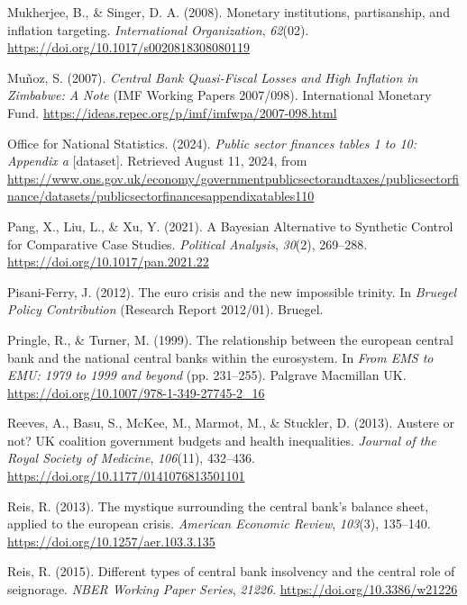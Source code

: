 \documentclass[
  a4paper,
  abstract=true]{scrartcl}
\newlength{\cslhangindent}
\newenvironment{CSLReferences}[2] %
 {\begin{list}{}{%
  \setlength{\itemindent}{0pt}
  \setlength{\leftmargin}{0pt}
  \setlength{\parsep}{0pt}
  \ifodd #1
   \setlength{\leftmargin}{\cslhangindent}
   \setlength{\itemindent}{-1\cslhangindent}
  \fi
  \setlength{\itemsep}{#2\baselineskip}}}
 {\end{list}}
\theoremstyle{definition}
\begin{document}
\begin{CSLReferences}{1}{0}
Mukherjee, B., \& Singer, D. A. (2008). Monetary institutions,
partisanship, and inflation targeting. \emph{International
Organization}, \emph{62}(02).
\url{https://doi.org/10.1017/s0020818308080119}

Muñoz, S. (2007). \emph{{Central Bank Quasi-Fiscal Losses and High
Inflation in Zimbabwe: A Note}} (IMF Working Papers 2007/098).
International Monetary Fund.
\url{https://ideas.repec.org/p/imf/imfwpa/2007-098.html}

Office for National Statistics. (2024). \emph{Public sector finances
tables 1 to 10: Appendix a} {[}dataset{]}. Retrieved August 11, 2024,
from
\url{https://www.ons.gov.uk/economy/governmentpublicsectorandtaxes/publicsectorfinance/datasets/publicsectorfinancesappendixatables110}

Pang, X., Liu, L., \& Xu, Y. (2021). A Bayesian Alternative to Synthetic
Control for Comparative Case Studies. \emph{Political Analysis},
\emph{30}(2), 269--288. \url{https://doi.org/10.1017/pan.2021.22}

Pisani-Ferry, J. (2012). The euro crisis and the new impossible trinity.
In \emph{Bruegel Policy Contribution} (Research Report 2012/01).
Bruegel.

Pringle, R., \& Turner, M. (1999). The relationship between the european
central bank and the national central banks within the eurosystem. In
\emph{From EMS to EMU: 1979 to 1999 and beyond} (pp. 231--255). Palgrave
Macmillan UK. \url{https://doi.org/10.1007/978-1-349-27745-2_16}

Reeves, A., Basu, S., McKee, M., Marmot, M., \& Stuckler, D. (2013).
Austere or not? UK coalition government budgets and health inequalities.
\emph{Journal of the Royal Society of Medicine}, \emph{106}(11),
432--436. \url{https://doi.org/10.1177/0141076813501101}

Reis, R. (2013). The mystique surrounding the central bank's balance
sheet, applied to the european crisis. \emph{American Economic Review},
\emph{103}(3), 135--140. \url{https://doi.org/10.1257/aer.103.3.135}

Reis, R. (2015). Different types of central bank insolvency and the
central role of seignorage. \emph{NBER Working Paper Series},
\emph{21226}. \url{https://doi.org/10.3386/w21226}


\end{CSLReferences}
\end{document}
